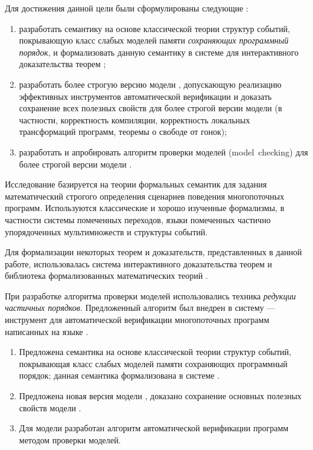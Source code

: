 Для достижения данной цели были сформулированы следующие {\tasks}:
\begin{enumerate}[beginpenalty=10000] %
  \item разработать семантику на основе классической теории структур событий, 
    покрывающую класс слабых моделей памяти \emph{сохраняющих программный порядок},
    и формализовать данную семантику в системе для интерактивного доказательства теорем \coq;
  \item разработать более строгую версию модели \WkmS, допускающую реализацию 
    эффективных инструментов автоматической верификации
    и доказать сохранение всех полезных свойств \Wkm для более строгой версии модели 
    (в частности, корректность компиляции, корректность локальных трансформаций программ, 
     теоремы о свободе от гонок);
  \item разработать и апробировать алгоритм проверки моделей (model~checking) для 
    более строгой версии модели \WkmS.
\end{enumerate}

{\methods}

Исследование базируется на теории формальных семантик для 
задания математический строгого определения сценариев поведения многопоточных программ. 
Используются классические и хорошо изученные формализмы, в частности 
системы помеченных переходов, языки помеченных частично упорядоченных мультимножеств и структуры событий. 

Для формализации некоторых теорем и доказательств, представленных в данной работе, 
использовалась система интерактивного доказательства теорем \coq 
и библиотека формализованных математических теорий \mathcomp.

При разработке алгоритма проверки моделей использовались техника \emph{редукции частичных порядков}.
Предложенный алгоритм был внедрен в систему \genmc --- 
инструмент для автоматической верификации многопоточных программ написанных на языке \CLANG.

{}
\begin{enumerate}[beginpenalty=10000] %
  \item Предложена семантика на основе классической теории структур событий, 
    покрывающая класс слабых моделей памяти сохраняющих программный порядок;
    данная семантика формализована в системе \coq.
  \item Предложена новая версия модели \WkmS, 
    доказано сохранение основных полезных свойств модели \Wkm.
  \item Для модели \WkmS разработан алгоритм автоматической 
    верификации программ методом проверки моделей.
\end{enumerate}

